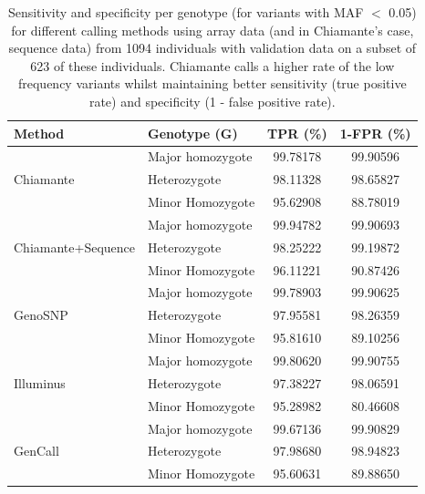 \begin{table}
\begin{center}
\begin{tabular}{|ll|c|c|}
  \hline
 Method & Genotype (G) &TPR (\%) & 1-FPR (\%)\\
 \hline
          & Major homozygote   & 99.78178 & 99.90596 \\
 Chiamante& Heterozygote     & 98.11328 & 98.65827 \\
          & Minor Homozygote   & 95.62908 & 88.78019 \\
 \hline
                   & Major homozygote    & 99.94782 & 99.90693 \\
 Chiamante+Sequence& Heterozygote     & 98.25222 & 99.19872 \\
                   & Minor Homozygote       & 96.11221 & 90.87426 \\
 \hline   
          & Major homozygote    & 99.78903 & 99.90625 \\
 GenoSNP & Heterozygote    & 97.95581 & 98.26359 \\
          & Minor Homozygote    & 95.81610 & 89.10256 \\
 \hline
          & Major homozygote    & 99.80620 & 99.90755 \\
 Illuminus& Heterozygote      & 97.38227 & 98.06591 \\
          & Minor Homozygote    & 95.28982 & 80.46608 \\
\hline
        & Major homozygote        & 99.67136 & 99.90829 \\
 GenCall& Heterozygote     & 97.98680 & 98.94823 \\ 
        & Minor Homozygote      & 95.60631 & 89.88650 \\
 \hline

\end{tabular}
\caption[Genotype calling performance at low frequency SNPs]{Sensitivity and specificity per genotype (for variants with MAF $<$ 0.05) for different calling methods using array data (and in Chiamante's case, sequence data) from 1094 individuals with validation data on a subset of 623 of these individuals.  Chiamante calls a higher rate of the low frequency variants whilst maintaining better sensitivity (true positive rate) and specificity (1 - false positive rate).}
\label{1094tab4}
\end{center}
\end{table}

